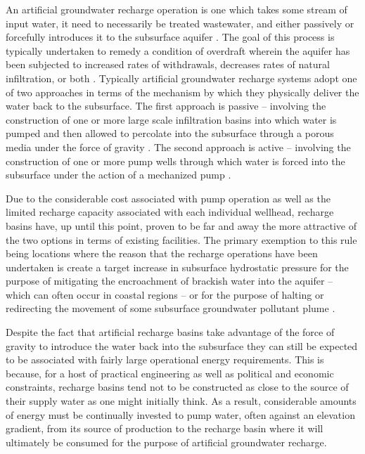An artificial groundwater recharge operation is one which takes some stream of input water, it need to necessarily be treated wastewater, and either passively or forcefully introduces it to the subsurface aquifer \cite{Bouwer1999}. The goal of this process is typically undertaken to remedy a condition of overdraft wherein the aquifer has been subjected to increased rates of withdrawals, decreases rates of natural infiltration, or both \cite{Seiler2007}. Typically artificial groundwater recharge systems adopt one of two approaches in terms of the mechanism by which they physically deliver the water back to the subsurface. The first approach is passive -- involving the construction of one or more large scale infiltration basins into which water is pumped and then allowed to percolate into the subsurface through a porous media under the force of gravity \cite{NRC2012}. The second approach is active -- involving the construction of one or more pump wells through which water is forced into the subsurface under the action of a mechanized pump \cite{NRC2012}. 

Due to the considerable cost associated with pump operation as well as the limited recharge capacity associated with each individual wellhead, recharge basins have, up until this point, proven to be far and away the more attractive of the two options in terms of existing facilities. The primary exemption to this rule being locations where the reason that the recharge operations have been undertaken is create a target increase in subsurface hydrostatic pressure for the purpose of mitigating the encroachment of brackish water into the aquifer -- which can often occur in coastal regions -- or for the purpose of halting or redirecting the movement of some subsurface groundwater pollutant plume \cite{Rodrigo2012}. 

Despite the fact that artificial recharge basins take advantage of the force of gravity to introduce the water back into the subsurface they can still be expected to be associated with fairly large operational energy requirements. This is because, for a host of practical engineering as well as political and economic constraints, recharge basins tend not to be constructed as close to the source of their supply water as one might initially think. As a result, considerable amounts of energy must be continually invested to pump water, often against an elevation gradient, from its source of production to the recharge basin where it will ultimately be consumed for the purpose of artificial groundwater recharge. 
              

